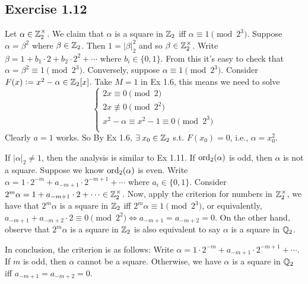 \documentclass[../Koblitz.tex]{subfiles}
\begin{document}
\subsection*{Exercise 1.12}

Let $\alpha\in\mathbb{Z}_2^\times$. We claim that $\alpha$ is a square in $\mathbb{Z}_2$ iff
$\alpha\equiv 1\pmod{2^3}$. Suppose $\alpha=\beta^2$ where $\beta\in\mathbb{Z}_2$. Then $1=|\beta|_2^2$ and so $\beta\in\mathbb{Z}_2^\times$. Write $\beta=1+b_1\cdot2+b_2\cdot2^2+\cdots$ where $b_i\in\{0,1\}$. From this it's easy to check that $\alpha=\beta^2\equiv 1\pmod{2^3}$. Conversely, suppose $\alpha\equiv1\pmod{2^3}$. Consider $F(x):=x^2-\alpha\in\mathbb{Z}_2[x]$. Take $M=1$ in Ex 1.6, this means we need to solve
$$
\begin{cases*}
2x \equiv0\pmod{2} \\
2x \not\equiv0\pmod{2^2} \\
x^2-\alpha \equiv x^2-1 \equiv0 \pmod{2^3} \\
\end{cases*}
$$
Clearly $a=1$ works. So By Ex 1.6, $\exists x_0\in\ZZ_2$ s.t. $F(x_0)=0$, i.e., $\alpha=x_0^2$.

If $|\alpha|_2\neq 1$, then the analysis is similar to Ex 1.11. If $\operatorname{ord}_2(\alpha)$ is odd, then $\alpha$ is not a square. Suppose we know $\operatorname{ord}_2(\alpha)$ is even. Write $\alpha=1\cdot2^{-m}+a_{-m+1}\cdot2^{-m+1}+\cdots$ where $a_i\in\{0,1\}$. Consider $2^m\alpha =1+a_{-m+1}\cdot2+\cdots \in\mathbb{Z}_2^\times$. Now, apply the criterion for numbers in $\mathbb{Z}_2^\times$, we have that $2^m\alpha$ is a square in $\mathbb{Z}_2$ iff $2^m\alpha\equiv 1 \pmod{2^3}$, or equivalently, $a_{-m+1}+a_{-m+2}\cdot2\equiv0\pmod{2^2} \iff a_{-m+1}=a_{-m+2}=0$. On the other hand, observe that $2^m\alpha$ is a square in $\mathbb{Z}_2$ is also equivalent to say $\alpha$ is a square in $\mathbb{Q}_2$.

In conclusion, the criterion is as follows: Write $\alpha=1\cdot2^{-m}+a_{-m+1}\cdot2^{-m+1}+\cdots$. If $m$ is odd, then $\alpha$ cannot be a square. Otherwise, we have $\alpha$ is a square in $\mathbb{Q}_2$ iff $a_{-m+1}=a_{-m+2}=0$.
\end{document}
